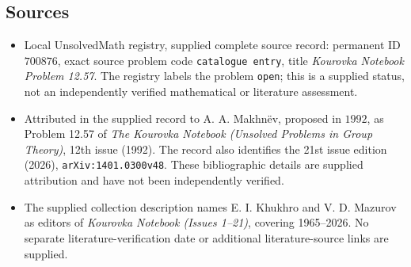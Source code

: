 \documentclass[11pt]{article}
\begin{document}
\subsection{Sources}
\begin{itemize}
\item Local UnsolvedMath registry, supplied complete source record: permanent ID \(700876\), exact source problem code \texttt{catalogue entry}, title \emph{Kourovka Notebook Problem 12.57}. The registry labels the problem \texttt{open}; this is a supplied status, not an independently verified mathematical or literature assessment.
\item Attributed in the supplied record to A. A. Makhn\"ev, proposed in \(1992\), as Problem 12.57 of \emph{The Kourovka Notebook (Unsolved Problems in Group Theory)}, 12th issue (1992). The record also identifies the 21st issue edition (2026), \texttt{arXiv:1401.0300v48}. These bibliographic details are supplied attribution and have not been independently verified.
\item The supplied collection description names E. I. Khukhro and V. D. Mazurov as editors of \emph{Kourovka Notebook (Issues 1--21)}, covering 1965--2026. No separate literature-verification date or additional literature-source links are supplied.
\end{itemize}
\end{document}

